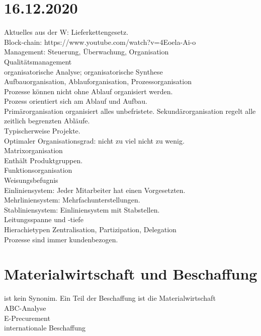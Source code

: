 \documentclass{article}
\begin{document}
	\section*{16.12.2020}
	Aktuelles aus der W: Lieferkettengesetz. \\
	Block-chain: https://www.youtube.com/watch?v=4Eoela-Ai-o \\
	Management: Steuerung, Überwachung, Organisation \\
	Qualitätsmanagement \\
	organisatorische Analyse; organisatorische Synthese \\
	Aufbauorganisation, Ablauforganisation, Prozessorganisation \\
	Prozesse können nicht ohne Ablauf organisiert werden. \\
	Prozess orientiert sich am Ablauf und Aufbau. \\
	Primärorganisation organisiert alles unbefristete. Sekundärorganisation regelt alle zeitlich begrenzten Abläufe. \\
	Typischerweise Projekte. \\
	Optimaler Organisationsgrad: nicht zu viel nicht zu wenig. \\
	Matrixorganisation \\
	Enthält Produktgruppen. \\
	Funktionsorganisation \\
	Weisungsbefugnis \\
	Einliniensystem: Jeder Mitarbeiter hat einen Vorgesetzten. \\
	Mehrliniensystem: Mehrfachunterstellungen. \\
	Stabliniensystem: Einliniensystem mit Stabstellen. \\
	Leitungsspanne und -tiefe \\
	Hierachietypen Zentralisation, Partizipation, Delegation \\
	Prozesse sind immer kundenbezogen. \\
	\section*{Materialwirtschaft und Beschaffung}
	ist kein Synonim. Ein Teil der Beschaffung ist die Materialwirtschaft \\
	ABC-Analyse \\
	E-Precurement \\
	internationale Beschaffung \\
\end{document}
